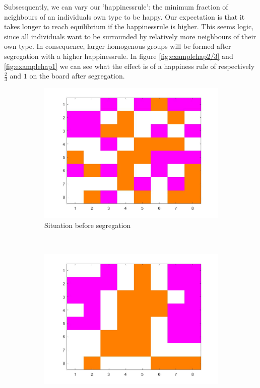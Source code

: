 Subsesquently, we can vary our 'happinessrule': the minimum fraction of neighbours of an individuals own type to be happy.
Our expectation is that it takes longer to reach equilibrium if the happinessrule is higher.
This seems logic, since all individuals want to be surrounded by relatively more neighbours of their own type.
In consequence, larger homogenous groups will be formed after segregation with a higher happinessrule.
In figure \ref{fig:examplehap2/3} and \ref{fig:examplehap1} we can see what the effect is of a happiness rule of respectively $\frac{2}{3}$ and $1$ on the board after segregation.

\begin{figure}[H]
	\centering
    \begin{subfigure}{0.4\textwidth}
        \includegraphics[width=\textwidth]{vb3beginbord.jpg}
        \caption{Situation before segregation}
        \label{fig:example hap 2/3 begin}
    \end{subfigure}\hspace{0cm}
    ~ 
    \begin{subfigure}{0.4\textwidth}
        \includegraphics[width=\textwidth]{vb3eindbord.jpg}

\end{subfigure}
\end{figure}

